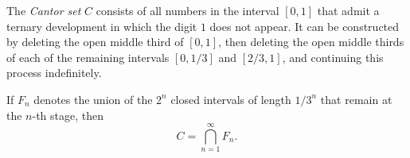 The \textit{Cantor set} $C$ consists of all numbers in the interval $[0, 1]$ that admit a ternary development in which the digit $1$ does not appear. It can be constructed by deleting the open middle third of $[0, 1]$, then deleting the open middle thirds of each of the remaining intervals $[0, 1/3]$ and $[2/3, 1]$, and continuing this process indefinitely.

If $F_n$ denotes the union of the $2^n$ closed intervals of length $1/3^n$ that remain at the $n$-th stage, then
$$C = \bigcap_{n=1}^{\infty} F_n.$$
